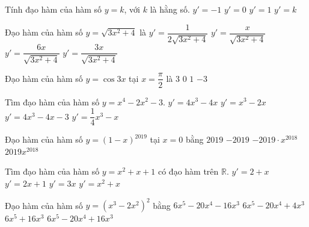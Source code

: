 \begin{ex}%
	Tính đạo hàm của hàm số $y=k$, với $k$ là  hằng số.
	\choice 
		{$y'=-1 $} 
		{\True $y'=0 $} 
		{$y'=1  $}
		{$y'=k  $}
\end{ex}

\begin{ex}%
	Đạo  hàm của hàm số $y=\sqrt{3x^2+4}$ là
	\choice 
		{$y'=\dfrac{1}{2\sqrt{3x^2+4}}$} 
		{$y'=\dfrac{x}{\sqrt{3x^2+4}}$} 
		{$y'=\dfrac{6x}{\sqrt{3x^2+4}}$} 
		 {\True $y'=\dfrac{3x}{\sqrt{3x^2+4}}$}
\end{ex}

\begin{ex}%
	Đạo hàm của hàm số $y=\cos 3 x$  tại $x=\dfrac{\pi}{2}$ là
	 \choice
		{\True  $3$}
		 {$0$}
		{$1$} 
		{$-3$} 
\end{ex}

\begin{ex}%
	Tìm đạo  hàm của hàm số $y=x^4-2x^2-3$.
	 \choice
		 {\True $y'=4x^3-4x$}
		{$y'=x^3-2x$} 
		{$y'=4x^3-4x-3$} 
		{$y'=\dfrac{1}{4}x^3-x$} 
\end{ex}

\begin{ex}%
	Đạo hàm của hàm số $y=(1-x)^{2019}$ tại  $x=0$ bằng
	\choice 
		{$2019$} 
		{\True $-2019$} 
		{$-2019\cdot  x^{2018}$}
		{$2019x^{2018}$} 
\end{ex}

\begin{ex}%
	Tìm đạo hàm của hàm số $y =  x^2 +x +1$ có đạo hàm trên $\mathbb{R}$.
	 \choice
		{$y'=2+x$} 
		{\True  $y'=2x+1$}
		{$y'=3x$} 
		{$y'=x^2+x$} 
\end{ex}

\begin{ex}%
	Đạo hàm của hàm số $y=\left( x^3-2x^2  \right)^2$ bằng
	\choice 
		 {$6x^5-20x^4-16x^3$}
		{$6x^5-20x^4+4x^3$} 
		{$6x^5+16x^3$} 
		{\True  $6x^5-20x^4+16x^3$}
\end{ex}

